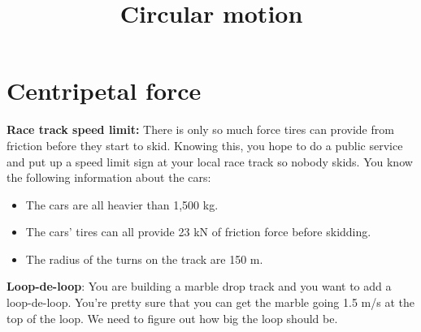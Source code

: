 \documentclass{handout}
\title{Circular motion}
\begin{document}
\maketitle
\practiceinstructions

\section{Centripetal force}
\begin{questions}
    \question \textbf{Race track speed limit:} There is only so much force tires can provide from friction before they start to skid. Knowing this, you hope to do a public service and put up a speed limit sign at your local race track so nobody skids. You know the following information about the cars:
    \begin{itemize}
        \item The cars are all heavier than 1,500 kg.
        \item The cars' tires can all provide 23 kN of friction force before skidding.
        \item The radius of the turns on the track are 150 m.
    \end{itemize}

    \question \textbf{Loop-de-loop}: You are building a marble drop track and you want to add a loop-de-loop. You're pretty sure that you can get the marble going 1.5 m/s at the top of the loop. We need to figure out how big the loop should be.
    \begin{parts}

\end{parts}
\end{questions}
\end{document}
